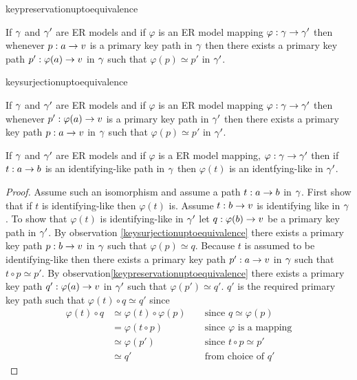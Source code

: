 keypreservationuptoequivalence
\begin{observation}
If $\gamma$ and $\gamma'$ are ER models and if $\varphi$ is an ER model mapping $\varphi: \gamma \rightarrow \gamma'$ then whenever 
$p:a \rightarrow v$ is a primary key path in $\gamma$ then there exists a primary key path 
$p':\varphi(a) \rightarrow v$ in $\gamma$ such that $\varphi(p) \simeq p'$ in $\gamma'$.
\end{observation}

keysurjectionuptoequivalence
\begin{observation}
If $\gamma$ and $\gamma'$ are ER models and if $\varphi$ is an ER model mapping $\varphi: \gamma \rightarrow \gamma'$ then whenever $p':\varphi(a) \rightarrow v$ is a primary key path in $\gamma'$ then there exists a primary key path $p:a \rightarrow v$ in $\gamma$ such that $\varphi(p) \simeq p'$ in $\gamma'$.
\end{observation}
 
\begin{lemma}
If $\gamma$ and $\gamma'$ are ER models and  if  $\varphi$ is a ER model mapping, $\varphi: \gamma \rightarrow \gamma'$ then if $t:a \rightarrow b$ is an identifying-like  path in $\gamma$ then $\varphi(t)$ is an identfying-like in $\gamma'$.
\end{lemma}

\begin{proof}
Assume such an isomorphism and assume a path $t: a \rightarrow b$ in $\gamma$. 
First show that if $t$ is identifying-like then $\varphi(t)$ is. Assume $t: b \rightarrow v$ is identifying like in $\gamma$. To show that $\varphi(t)$
is identifying-like in $\gamma'$ let $q : \varphi(b) \rightarrow v$ be a primary key path in $\gamma'$. By observation \ref{keysurjectionuptoequivalence} there exists a primary key path $p : b \rightarrow v$ in $\gamma$ such that $\varphi(p) \simeq q$. Because $t$ is assumed to be identifying-like then there exists a primary key path $p': a  \rightarrow  v$ in $\gamma$ such that $t \circ p \simeq p'$. By observation\ref{keypreservationuptoequivalence} there exists a primary key path $q' : \varphi(a)  \rightarrow  v$ in $\gamma'$
such that $\varphi(p') \simeq q'$. $q'$ is the required primary key path such that $\varphi(t) \circ q \simeq q'$ since
\begin{align*}
\varphi(t) \circ q  & \simeq \varphi(t) \circ \varphi(p)       && \mbox{ since $q \simeq \varphi(p)$}    \\
                    & =      \varphi(t \circ  p)                && \mbox{ since $\varphi$ is a mapping} \\
                    & \simeq \varphi(p')                        && \mbox{ since $t \circ p \simeq p'$}           \\
                    & \simeq q'                                 && \mbox{ from choice of $q'$}   
\end{align*}
\end{proof}

